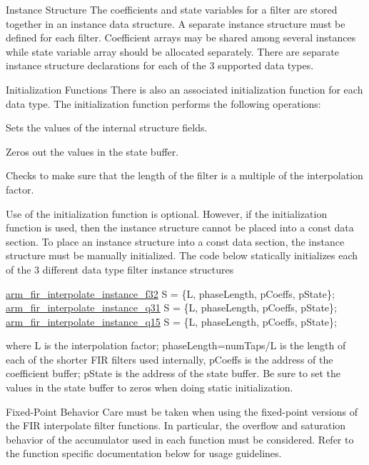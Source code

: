 \begin{DoxyParagraph}{Instance Structure }
The coefficients and state variables for a filter are stored together in an instance data structure. A separate instance structure must be defined for each filter. Coefficient arrays may be shared among several instances while state variable array should be allocated separately. There are separate instance structure declarations for each of the 3 supported data types.
\end{DoxyParagraph}
\begin{DoxyParagraph}{Initialization Functions }
There is also an associated initialization function for each data type. The initialization function performs the following operations\-:
\begin{DoxyItemize}
\item Sets the values of the internal structure fields.
\item Zeros out the values in the state buffer.
\item Checks to make sure that the length of the filter is a multiple of the interpolation factor.
\end{DoxyItemize}
\end{DoxyParagraph}
\begin{DoxyParagraph}{}
Use of the initialization function is optional. However, if the initialization function is used, then the instance structure cannot be placed into a const data section. To place an instance structure into a const data section, the instance structure must be manually initialized. The code below statically initializes each of the 3 different data type filter instance structures 
\begin{DoxyPre}    
\hyperlink{structarm__fir__interpolate__instance__f32}{arm\_fir\_interpolate\_instance\_f32} S = \{L, phaseLength, pCoeffs, pState\};    
\hyperlink{structarm__fir__interpolate__instance__q31}{arm\_fir\_interpolate\_instance\_q31} S = \{L, phaseLength, pCoeffs, pState\};    
\hyperlink{structarm__fir__interpolate__instance__q15}{arm\_fir\_interpolate\_instance\_q15} S = \{L, phaseLength, pCoeffs, pState\};    
\end{DoxyPre}
 where {\ttfamily L} is the interpolation factor; {\ttfamily phase\-Length=num\-Taps/\-L} is the length of each of the shorter F\-I\-R filters used internally, {\ttfamily p\-Coeffs} is the address of the coefficient buffer; {\ttfamily p\-State} is the address of the state buffer. Be sure to set the values in the state buffer to zeros when doing static initialization.
\end{DoxyParagraph}
\begin{DoxyParagraph}{Fixed-\/\-Point Behavior }
Care must be taken when using the fixed-\/point versions of the F\-I\-R interpolate filter functions. In particular, the overflow and saturation behavior of the accumulator used in each function must be considered. Refer to the function specific documentation below for usage guidelines. 
\end{DoxyParagraph}


